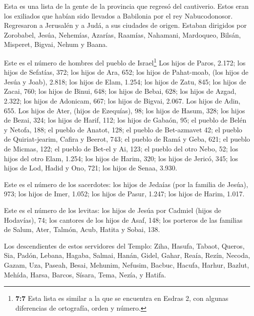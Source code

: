  Esta es una lista de la gente de la provincia que regresó
del cautiverio. Estos eran los exiliados que habían sido llevados a
Babilonia por el rey Nabucodonosor. Regresaron a Jerusalén y a Judá, a
sus ciudades de origen.  Estaban dirigidos por Zorobabel,
Jesúa, Nehemías, Azarías, Raamías, Nahamani, Mardoqueo, Bilsán,
Misperet, Bigvai, Nehum y Baana.

Este es el número de hombres del pueblo de Israel\footnote{\textbf{7:7}
  Esta lista es similar a la que se encuentra en Esdras 2, con algunas
  diferencias de ortografía, orden y número.}  Los hijos de
Paros, 2.172;  los hijos de Sefatías, 372;  los
hijos de Ara, 652;  los hijos de Pahat-moab, (los hijos de
Jesúa y Joab), 2.818;  los hijos de Elam, 1.254;
 los hijos de Zatu, 845;  los hijos de Zacai,
760;  los hijos de Binui, 648;  los hijos de
Bebai, 628;  los hijos de Azgad, 2.322;  los
hijos de Adonicam, 667;  los hijos de Bigvai, 2.067.
 Los hijos de Adin, 655.  Los hijos de Ater,
(hijos de Ezequías), 98;  los hijos de Hasum, 328;
 los hijos de Bezai, 324;  los hijos de Harif,
112;  los hijos de Gabaón, 95;  el pueblo de
Belén y Netofa, 188;  el pueblo de Anatot, 128;
 el pueblo de Bet-azmavet 42;  el pueblo de
Quiriat-jearim, Cafira y Beerot, 743;  el pueblo de Ramá y
Geba, 621;  el pueblo de Micmas, 122;  el
pueblo de Bet-el y Ai, 123;  el pueblo del otro Nebo, 52;
 los hijos del otro Elam, 1.254;  los hijos de
Harim, 320;  los hijos de Jericó, 345;  los
hijos de Lod, Hadid y Ono, 721;  los hijos de Senaa, 3.930.

 Este es el número de los sacerdotes: los hijos de Jedaías
(por la familia de Jesúa), 973;  los hijos de Imer, 1.052;
 los hijos de Pasur, 1.247;  los hijos de
Harim, 1.017.

 Este es el número de los levitas: los hijos de Jesúa por
Cadmiel (hijos de Hodavías), 74;  los cantores de los hijos
de Asaf, 148;  los porteros de las familias de Salum, Ater,
Talmón, Acub, Hatita y Sobai, 138.

 Los descendientes de estos servidores del Templo: Ziha,
Hasufa, Tabaot,  Queros, Sia, Padón,  Lebana,
Hagaba, Salmai,  Hanán, Gidel, Gahar,  Reaía,
Rezín, Necoda,  Gazam, Uza, Paseah,  Besai,
Mehunim, Nefusim,  Bacbuc, Hacufa, Harhur, 
Bazlut, Mehída, Harsa,  Barcos, Sísara, Tema, 
Nezía, y Hatifa.


